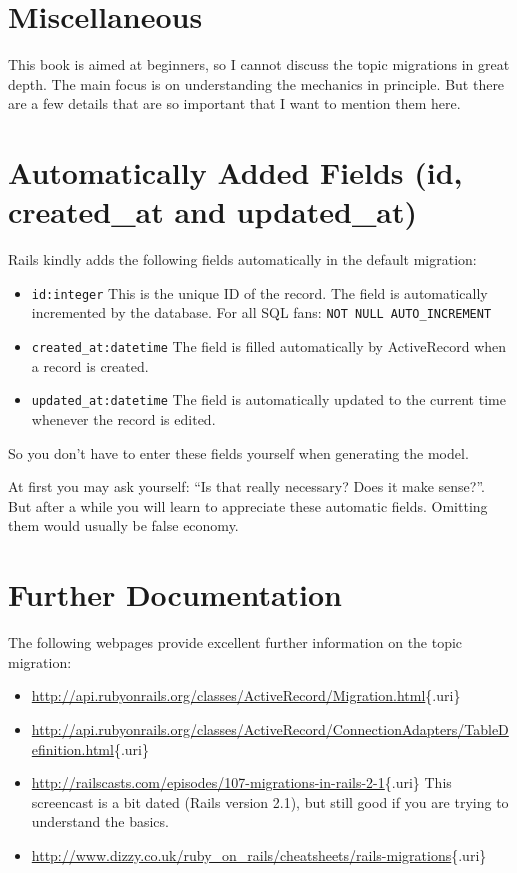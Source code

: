 \documentclass[a4paper]{book}
\newcounter{tab}[chapter]
\begin{document}
\section{Miscellaneous}\label{miscellaneous-1}

This book is aimed at beginners, so I cannot discuss the topic migrations in great depth. The main focus is on understanding the mechanics in principle. But there are a few details that are so important that I want to mention them here.

\section{Automatically Added Fields (id, created\_at and updated\_at)}\label{automatically-added-fields-id-createdux5fat-and-updatedux5fat}

Rails kindly adds the following fields automatically in the default migration:

\begin{itemize}
\itemsep1pt\parskip0pt
\item
  \texttt{id:integer} This is the unique ID of the record. The field is automatically incremented by the database. For all SQL fans: \texttt{NOT NULL AUTO\_INCREMENT}
\item
  \texttt{created\_at:datetime} The field is filled automatically by ActiveRecord when a record is created.
\item
  \texttt{updated\_at:datetime} The field is automatically updated to the current time whenever the record is edited.
\end{itemize}

So you don't have to enter these fields yourself when generating the model.

At first you may ask yourself: “Is that really necessary? Does it make sense?”. But after a while you will learn to appreciate these automatic fields. Omitting them would usually be false economy.

\section{Further Documentation}\label{further-documentation-1}

The following webpages provide excellent further information on the topic migration:

\begin{itemize}
\itemsep1pt\parskip0pt
\item
  \url{http://api.rubyonrails.org/classes/ActiveRecord/Migration.html}\{.uri\}
\item
  \url{http://api.rubyonrails.org/classes/ActiveRecord/ConnectionAdapters/TableDefinition.html}\{.uri\}
\item
  \url{http://railscasts.com/episodes/107-migrations-in-rails-2-1}\{.uri\} This screencast is a bit dated (Rails version 2.1), but still good if you are trying to understand the basics.
\item
  \url{http://www.dizzy.co.uk/ruby_on_rails/cheatsheets/rails-migrations}\{.uri\}
\end{itemize}
\end{document}
